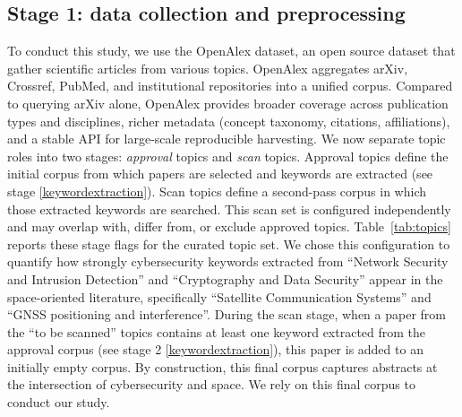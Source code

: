 \documentclass{article}
\begin{document}
\subsection{Stage 1: data collection and preprocessing}
To conduct this study, we use the OpenAlex dataset, an open source dataset that gather scientific articles from various topics.
OpenAlex aggregates arXiv, Crossref, PubMed, and institutional repositories into a unified corpus.
Compared to querying arXiv alone, OpenAlex provides broader coverage across publication types and disciplines, richer metadata (concept taxonomy, citations, affiliations), and a stable API for large-scale reproducible harvesting.
We now separate topic roles into two stages: \textit{approval} topics and \textit{scan} topics.
Approval topics define the initial corpus from which papers are selected and keywords are extracted (see stage \ref{keywordextraction}).
Scan topics define a second-pass corpus in which those extracted keywords are searched.
This scan set is configured independently and may overlap with, differ from, or exclude approved topics.
Table~\ref{tab:topics} reports these stage flags for the curated topic set.
We chose this configuration to quantify how strongly cybersecurity keywords extracted from ``Network Security and Intrusion Detection'' and ``Cryptography and Data Security'' appear in the space-oriented literature,
specifically ``Satellite Communication Systems'' and ``GNSS positioning and interference''.
During the scan stage, when a paper from the ``to be scanned'' topics contains at least one keyword extracted from the approval corpus (see stage 2 \ref{keywordextraction}), this paper is added to an initially empty corpus. By construction, this final corpus captures abstracts at the intersection of cybersecurity and space. We rely on this final corpus to conduct our study.
\end{document}
